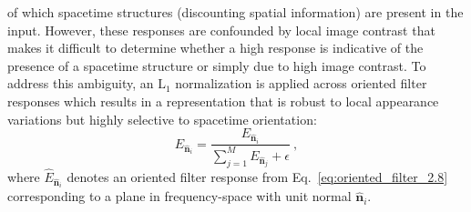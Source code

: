 of which spacetime structures (discounting spatial information) are
present in the input.
However, these responses are confounded by local image
contrast that makes 
it difficult to determine
whether a high response is indicative of the presence of
a spacetime structure or simply due to high image
contrast.
To address this ambiguity, an $\textrm{L}_1$
normalization is applied across oriented filter responses which
results in a representation that is robust to local
appearance variations but highly selective to 
spacetime orientation:
\begin{equation}
	\hat{E}_{\hat{\mathbf{n}}_i} = \frac{E_{\hat{\mathbf{n}}_i}}{\sum_{j = 1}^{M}{E_{\hat{\mathbf{n}}_j}} + \epsilon} \ ,
\end{equation}
where $\hat{E}_{\hat{\mathbf{n}}_i}$ denotes an oriented filter response from Eq.\ \ref{eq:oriented_filter_2.8} corresponding to a plane in frequency-space with unit normal $\hat{\mathbf{n}}_i$.